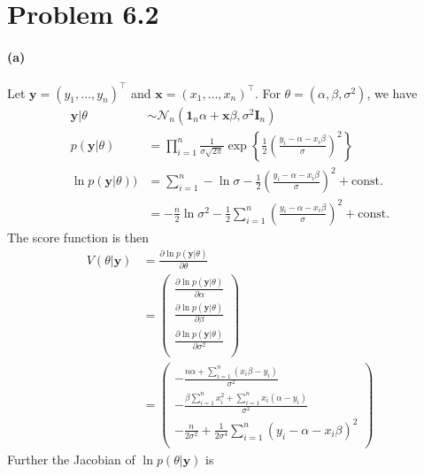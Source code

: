 \section{Problem 6.2}
\paragraph{(a)}
Let $\bm{y} = (y_1, \dots, y_n)^{\top}$ and $\bm{x}=(x_1, \dots, x_n)^{\top}$. For $\theta = (\alpha, \beta, \sigma^2)$, we have
\begin{align*}
    \bm{y} \vert \theta 
    & \sim \mathcal{N}_{n} \left( \bm{1}_n\alpha+\bm{x}\beta, \sigma^2\bm{I}_n \right)\\
    p(\bm{y} \vert \theta)
    &= \prod_{i=1}^{n}\frac{1}{\sigma\sqrt{2\pi}} \exp \left\{\frac{1}{2}\left( \frac{y_i - \alpha - x_i\beta}{\sigma} \right)^2 \right\} \\
    \ln p(\bm{y} \vert \theta))
    &= \sum_{i=1}^{n} -\ln \sigma - \frac{1}{2}\left( \frac{y_i - \alpha - x_i\beta}{\sigma} \right)^2 +\mathrm{const.}\\
    &= -\frac{n}{2}\ln \sigma^2 - \frac{1}{2} \sum_{i=1}^{n} \left( \frac{y_i - \alpha - x_i\beta}{\sigma} \right)^2 +\mathrm{const.}
\end{align*}
The score function is then
\begin{align*}
    V(\theta \vert \bm{y}) 
    &= \frac{\partial \ln p(\bm{y} \vert \theta)}{ \partial \theta} \\
    &=  \begin{pmatrix}
        \frac{\partial \ln p(\bm{y} \vert \theta)}{ \partial \alpha} \\ 
        \frac{\partial \ln p(\bm{y} \vert \theta)}{ \partial \beta} \\
        \frac{\partial \ln p(\bm{y} \vert \theta)}{ \partial \sigma^2} \\
        \end{pmatrix}\\
    &= \begin{pmatrix}
        -\frac{n\alpha + \sum_{i=1}^n (x_i\beta - y_i)}{\sigma^2} \\ 
        -\frac{\beta\sum_{i=1}^n x_i^2 + \sum_{i=1}^n x_i(\alpha - y_i)} {\sigma^2} \\
        -\frac{n}{2\sigma^2} + \frac{1}{2\sigma^4} \sum_{i=1}^n (y_i - \alpha - x_i\beta)^2 \\
        \end{pmatrix}
\end{align*}
Further the Jacobian of $\ln p(\theta \vert \bm{y})$ is 
